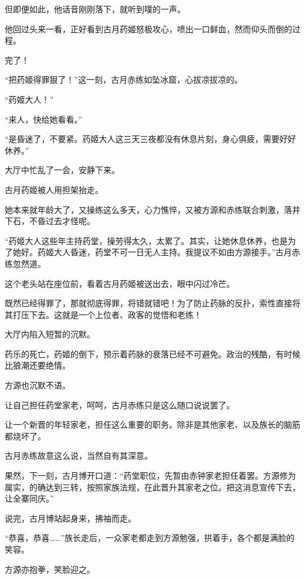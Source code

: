 \begin{this_body}
但即便如此，他话音刚刚落下，就听到噗的一声。

他回过头来一看，正好看到古月药姬怒极攻心，喷出一口鲜血，然而仰头而倒的过程。

完了！

“把药姬得罪狠了！”这一刻，古月赤练如坠冰窟，心拔凉拔凉的。

“药姬大人！”

“来人，快给她看看。”

“是昏迷了，不要紧。药姬大人这三天三夜都没有休息片刻，身心俱疲，需要好好休养。”

大厅中忙乱了一会，安静下来。

古月药姬被人用担架抬走。

她本来就年龄大了，又操练这么多天，心力憔悴，又被方源和赤练联合刺激，落井下石，不昏过去才怪呢。

“药姬大人这些年主持药堂，操劳得太久，太累了。其实，让她休息休养，也是为了她好。药姬大人昏迷，药堂不可一日无人主持。我提议不如由方源接手。”古月赤练忽然道。

这个老头站在座位前，看着古月药姬被送出去，眼中闪过冷芒。

既然已经得罪了，那就彻底得罪，将错就错吧！为了防止药脉的反扑，索性直接将其打压下去。这就是一个上位者、政客的觉悟和老练！

大厅内陷入短暂的沉默。

药乐的死亡，药姬的倒下，预示着药脉的衰落已经不可避免。政治的残酷，有时候比狼潮还要绝情。

方源也沉默不语。

让自己担任药堂家老，呵呵，古月赤练只是这么随口说说罢了。

让一个新晋的年轻家老，担任这么重要的职务。除非是其他家老、以及族长的脑筋都烧坏了。

古月赤练故意这么说，当然自有其深意。

果然，下一刻，古月博开口道：“药堂职位，先暂由赤钟家老担任着罢。方源修为属实，的确达到三转，按照家族法规，在此晋升其家老之位。把这消息宣传下去，让全寨同庆。”

说完，古月博站起身来，拂袖而走。

“恭喜，恭喜……”族长走后，一众家老都走到方源勉强，拱着手，各个都是满脸的笑容。

方源亦抱拳，笑脸迎之。

\end{this_body}

